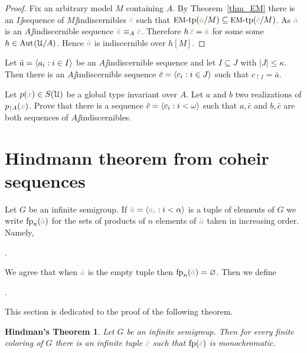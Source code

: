 \documentclass[creche.tex]{subfiles}
\begin{document}
\begin{proof}
  Fix an arbitrary model $M$ containing $A$.
By Theorem~\ref{thm_EM} there is an $I\jj$sequence of $M\jj$indiscernibles ${\color{brown}\bar c}$ such that $\textrm{{\small EM}\mbox{-}tp}({\color{brown}\bar a}/M)\subseteq\textrm{{\small EM}\mbox{-}tp}({\color{brown}\bar c}/M)$.
As ${\color{brown}\bar a}$ is an $A\jj$indiscernible sequence ${\color{brown}\bar a}\equiv_A{\color{brown}\bar c}$.
Therefore $h\,{\color{brown}\bar c}={\color{brown}\bar a}$ for some some $h\in\textrm{Aut\kern.15ex}(\EuScript U/A)$.
Hence ${\color{brown}\bar a}$ is indiscernible over $h[M]$.
\end{proof}

\begin{exercise}
Let $\bar a=\langle a_i:i\in I\rangle$ be an $A\jj$indiscernible sequence and let $I\subseteq J$ with $|J|\le \kappa$.
Then there is an $A\jj$indiscernible sequence $\bar c=\langle c_i:i\in J\rangle$ such that $c_{\restriction I}=\bar a$.\QED
\end{exercise}

\begin{exercise}
Let  $p({\color{brown} x})\in S(\EuScript U)$ be a global type invariant over $A$.
Let $a$ and $b$ two realizations of $p_{\restriction A}({\color{brown} x})$.
Prove that there is a sequence $\bar c=\langle c_i:i<\omega\rangle$ such that $a,\bar c$ and $b,\bar c$ are both sequences of $A\jj$indiscernibles.\QED
\end{exercise}


\section{Hindmann theorem from coheir sequences}\label{Hindman}

\def\fp{{\rm fp}}

Let $G$ be an infinite semigroup.
If ${\color{brown}\bar a}=\langle{\color{brown}a_i}:i<\alpha\rangle$ is a tuple of elements of $G$ we write $\fp_n({\mr\bar a})$ for the sets of products of $n$ elements of ${\color{brown}\bar a}$ taken in increasing order.
Namely,

\ceq{\hfill\emph{$\fp_n({\mr\bar a})$}}{=}{\Big\{{\mr a_{i_1}}\kern-0.5ex\cdot\dots\cdot{\mr a_{i_n}}\ :\quad i_0<\dots<i_{n-1}<\alpha\Big\}}.

We agree that when ${\color{brown}\bar a}$ is the empty tuple then $\fp_n({\mr\bar a})=\0$.
Then we define

\ceq{\hfill\emph{$\fp({\mr\bar a})$}}{=}{\bigcup_{n\in\omega}\fp_n({\mr\bar a})}.

This section is dedicated to the proof of the following theorem.

\theoremstyle{mio}
\newtheorem{Hindman}[thm]{Hindman's Theorem}
\begin{Hindman}\label{thm_Hindman}
Let $G$ be an infinite semigroup.
Then for every finite coloring of $G$ there is an infinite tuple ${\color{brown}\bar c}$ such that $\fp({\mr\bar c})$ is monochromatic.
\end{Hindman}
\end{document}
